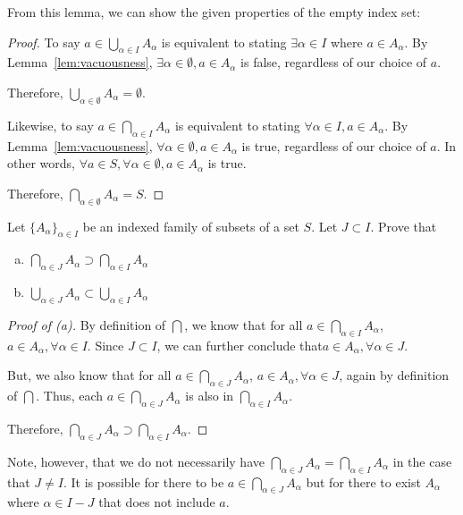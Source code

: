 From this lemma, we can show the given properties of the empty index set:

\begin{proof}
	To say $a \in \bigcup_{\alpha \in I} A_\alpha$ is equivalent to stating $\exists \alpha \in I$ where $a \in A_\alpha$.
	By Lemma~\ref{lem:vacuousness}, $\exists \alpha \in \emptyset, a \in A_\alpha$ is false, regardless of our choice of $a$.

	Therefore, $\bigcup_{\alpha \in \emptyset} A_\alpha = \emptyset$.

	Likewise, to say $a \in \bigcap_{\alpha \in I} A_\alpha$ is equivalent to stating $\forall \alpha \in I, a \in A_\alpha$.
	By Lemma~\ref{lem:vacuousness}, $\forall \alpha \in \emptyset, a \in A_\alpha$ is true, regardless of our choice of $a$.
	In other words, $\forall a \in S, \forall \alpha \in \emptyset, a \in A_\alpha$ is true.

	Therefore, $\bigcap_{\alpha \in \emptyset} A_\alpha = S$.
\end{proof}

\begin{problem}[3]
	Let $\{A_\alpha\}_{\alpha \in I}$ be an indexed family of subsets of a set $S$. Let $J \subset I$. Prove that
	\begin{enumerate}[(a)]
		\item $\bigcap_{\alpha \in J} A_\alpha \supset \bigcap_{\alpha \in I} A_\alpha$
		\item $\bigcup_{\alpha \in J} A_\alpha \subset \bigcup_{\alpha \in I} A_\alpha$
	\end{enumerate}
\end{problem}


\begin{proof}[Proof of (a)]
	By definition of $\bigcap$, we know that for all $a \in \bigcap_{\alpha \in I} A_\alpha$, $a \in A_\alpha, \forall \alpha \in I$.
	Since $J \subset I$, we can further conclude that$a \in A_\alpha, \forall \alpha \in J$.

	But, we also know that for all $a \in \bigcap_{\alpha \in J} A_\alpha$, $a \in A_\alpha, \forall \alpha \in J$, again by definition of $\bigcap$.
	Thus, each $a \in \bigcap_{\alpha \in J} A_\alpha$ is also in $\bigcap_{\alpha \in I} A_\alpha$.

	Therefore, $\bigcap_{\alpha \in J} A_\alpha \supset \bigcap_{\alpha \in I} A_\alpha$.
\end{proof}

Note, however, that we do not necessarily have $\bigcap_{\alpha \in J} A_\alpha = \bigcap_{\alpha \in I} A_\alpha$ in the case that $J \neq I$.
It is possible for there to be $a \in \bigcap_{\alpha \in J} A_\alpha$ but for there to exist $A_\alpha$ where $\alpha \in I - J$ that does not include $a$.

